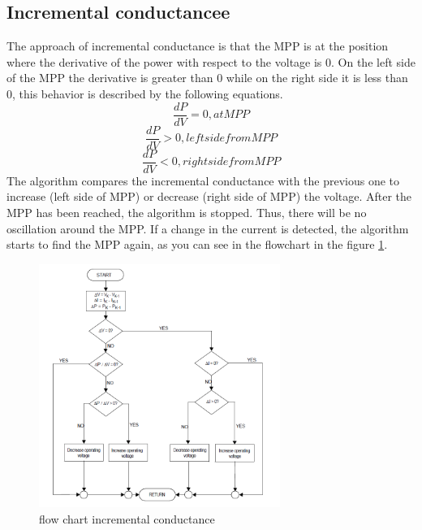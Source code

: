 \subsection{Incremental conductancee}
The approach of incremental conductance is that the MPP is at the position where the derivative of the power with respect to the voltage is 0. On the left side of the MPP the derivative is greater than 0 while on the right side it is less than 0, this behavior is described by the following equations.
\begin{equation} \label{Inccond1}
\frac{dP}{dV} = 0 ,at MPP 
\end{equation} 
\begin{equation} \label{Inccond2}
\frac{dP}{dV} > 0 ,left side from MPP 
\end{equation}
\begin{equation} \label{Inccond3}
\frac{dP}{dV} < 0 ,right side from MPP
\end{equation}
The algorithm compares the incremental conductance with the previous one to increase (left side of MPP) or decrease (right side of MPP) the voltage. After the MPP has been reached, the algorithm is stopped. Thus, there will be no oscillation around the MPP. If a change in the current is detected, the algorithm starts to find the MPP again, as you can see in the flowchart in the figure \ref{fcinccon}\cite{AN1521_MC}.
\begin{figure}[H]
	\begin{center}
		\includegraphics[width=0.7\textwidth]{../Pictures/P1/Flow_chart/flow_chart_incremental_conductance}
		\caption{flow chart incremental conductance \cite{AN1521_MC} }
		\label{fcinccon}
	\end{center}	
\end{figure}


